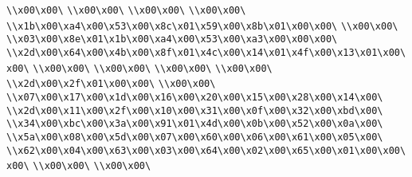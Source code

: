\verb|\\x00\x00\|\newline
\verb|\\x00\x00\|\newline
\verb|\\x00\x00\|\newline
\verb|\\x00\x00\|\newline
\verb|\\x1b\x00\xa4\x00\x53\x00\x8c\x01\x59\x00\x8b\x01\x00\x00\|\newline
\verb|\\x00\x00\|\newline
\verb|\\x03\x00\x8e\x01\x1b\x00\xa4\x00\x53\x00\xa3\x00\x00\x00\|\newline
\verb|\\x2d\x00\x64\x00\x4b\x00\x8f\x01\x4c\x00\x14\x01\x4f\x00\x13\x01\x00\x00\|\newline
\verb|\\x00\x00\|\newline
\verb|\\x00\x00\|\newline
\verb|\\x00\x00\|\newline
\verb|\\x00\x00\|\newline
\verb|\\x2d\x00\x2f\x01\x00\x00\|\newline
\verb|\\x00\x00\|\newline
\verb|\\x07\x00\x17\x00\x1d\x00\x16\x00\x20\x00\x15\x00\x28\x00\x14\x00\|\newline
\verb|\\x2d\x00\x11\x00\x2f\x00\x10\x00\x31\x00\x0f\x00\x32\x00\xbd\x00\|\newline
\verb|\\x34\x00\xbc\x00\x3a\x00\x91\x01\x4d\x00\x0b\x00\x52\x00\x0a\x00\|\newline
\verb|\\x5a\x00\x08\x00\x5d\x00\x07\x00\x60\x00\x06\x00\x61\x00\x05\x00\|\newline
\verb|\\x62\x00\x04\x00\x63\x00\x03\x00\x64\x00\x02\x00\x65\x00\x01\x00\x00\x00\|\newline
\verb|\\x00\x00\|\newline
\verb|\\x00\x00\|\newline
